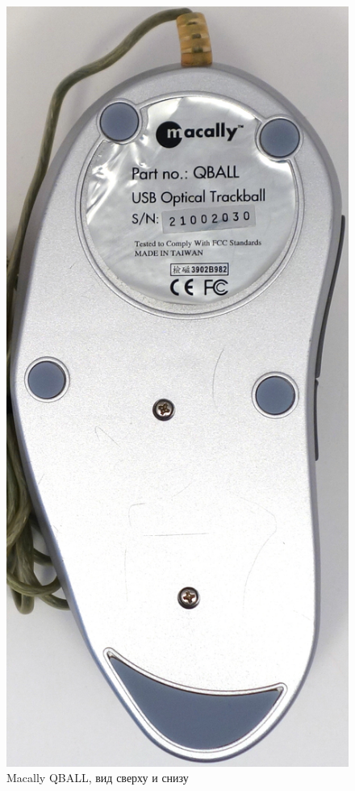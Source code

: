 \documentclass[11pt, a4paper]{article}
\begin{document}
\begin{figure}[h]
    \includegraphics[scale=0.45]{2001_macally_qball/bottom_30.jpg}
    \caption{Macally QBALL, вид сверху и снизу}
    \label{fig:MacallyQBALLTopBottom}
\end{figure}
\end{document}
